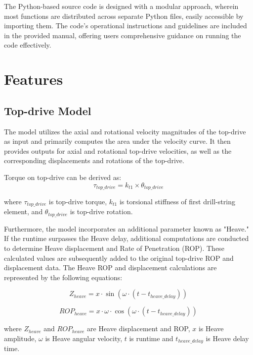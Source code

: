 The Python-based source code is designed with a modular approach, wherein most functions are distributed across separate Python files, easily accessible by importing them. The code's operational instructions and guidelines are included in the provided manual, offering users comprehensive guidance on running the code effectively.

\section{Features}
\subsection{Top-drive Model}

The model utilizes the axial and rotational velocity magnitudes of the top-drive as input and primarily computes the area under the velocity curve. It then provides outputs for axial and rotational top-drive velocities, as well as the corresponding displacements and rotations of the top-drive.

Torque on top-drive can be derived as:
\begin{equation}\label{TorqueEQ}
  \tau_{top\_drive} = k_{t1} \times \theta_{top\_drive}
\end{equation}

where 
$\tau_{top\_drive}$ is top-drive torque, $k_{t1}$ is torsional stiffness of first drill-string element, and $\theta_{top\_drive}$ is top-drive rotation.

Furthermore, the model incorporates an additional parameter known as "Heave." If the runtime surpasses the Heave delay, additional computations are conducted to determine Heave displacement and Rate of Penetration (ROP). These calculated values are subsequently added to the original top-drive ROP and displacement data. The Heave ROP and displacement calculations are represented by the following equations:

\begin{equation}\label{Z_heave}
  Z_{heave} = x \cdot \sin(\omega \cdot (t - t_{heave\_delay}))
\end{equation}

\begin{equation}\label{ROP_heave}
  ROP_{heave} = x \cdot \omega \cdot \cos(\omega \cdot (t - t_{heave\_delay}))
\end{equation}

where 
$Z_{heave}$ and $ROP_{heave}$ are Heave displacement and ROP, $x$ is Heave amplitude, $\omega$ is Heave angular velocity, $t$ is runtime and $t_{heave\_delay}$ is Heave delay time.
 
